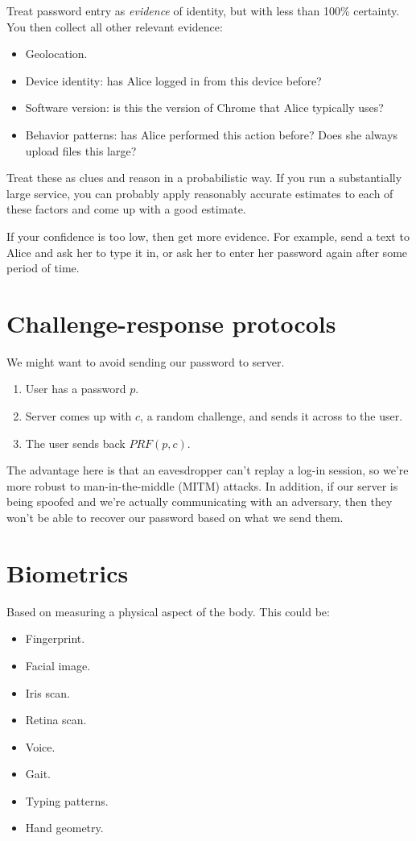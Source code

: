 \documentclass[12pt]{article}
\begin{document}
Treat password entry as \textit{evidence} of identity, but with less than 100\% certainty. You then collect all other relevant evidence:
\begin{itemize}
\item Geolocation.
\item Device identity: has Alice logged in from this device before?
\item Software version: is this the version of Chrome that Alice typically uses?
\item Behavior patterns: has Alice performed this action before? Does she always upload files this large?
\end{itemize}

Treat these as clues and reason in a probabilistic way. If you run a substantially large service, you can probably apply reasonably accurate estimates to each of these factors and come up with a good estimate.

If your confidence is too low, then get more evidence. For example, send a text to Alice and ask her to type it in, or ask her to enter her password again after some period of time.

\section*{Challenge-response protocols}

We might want to avoid sending our password to server.
\begin{enumerate}
\item User has a password $p$.
\item Server comes up with $c$, a random challenge, and sends it across to the user.
\item The user sends back $PRF(p, c)$.
\end{enumerate}

The advantage here is that an eavesdropper can't replay a log-in session, so we're more robust to man-in-the-middle (MITM) attacks. In addition, if our server is being spoofed and we're actually communicating with an adversary, then they won't be able to recover our password based on what we send them.

\section*{Biometrics}

Based on measuring a physical aspect of the body. This could be:
\begin{itemize}
\item Fingerprint.
\item Facial image.
\item Iris scan.
\item Retina scan.
\item Voice.
\item Gait.
\item Typing patterns.
\item Hand geometry.
\end{itemize}
\end{document}
